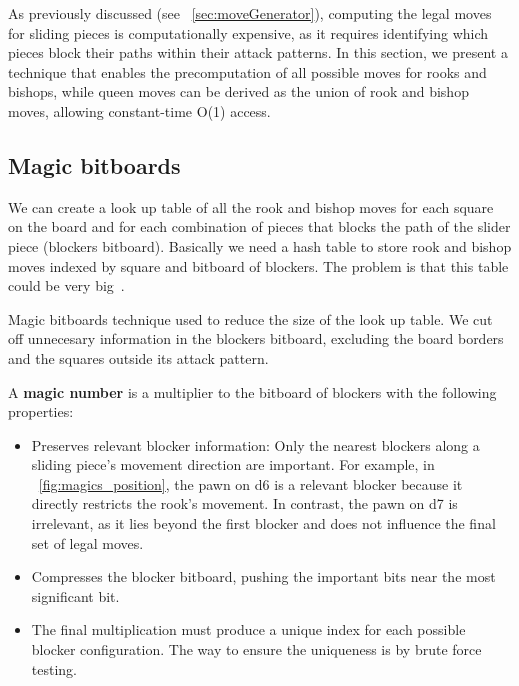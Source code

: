 As previously discussed (see ~\cref{sec:moveGenerator}), computing the legal moves for sliding pieces is computationally expensive, as it requires identifying which pieces block their paths within their attack patterns. In this section, we present a technique that enables the precomputation of all possible moves for rooks and bishops, while queen moves can be derived as the union of rook and bishop moves, allowing constant-time O(1) access.

\subsection*{Magic bitboards}

We can create a look up table of all the rook and bishop moves for each square on the board and for each combination of pieces that blocks the path of the slider piece (blockers  bitboard). Basically we need a hash table to store rook and bishop moves indexed by square and bitboard of blockers. The problem is that this table could be very big~\cite{MagicBitboards}.

\vspace{1em}

\noindent Magic bitboards technique used to reduce the size of the look up table. We cut off unnecesary information in the blockers bitboard, excluding the board borders and the squares outside its attack pattern.

\vspace{1em}

\noindent A \textbf{magic number} is a multiplier to the bitboard of blockers with the following properties:

\begin{itemize}[itemsep=1pt]
  \item Preserves relevant blocker information: 
    Only the nearest blockers along a sliding piece's movement direction are important. For example, in ~\cref{fig:magics_position}, the pawn on d6 is a relevant blocker because it directly restricts the rook's movement. In contrast, the pawn on d7 is irrelevant, as it lies beyond the first blocker and does not influence the final set of legal moves.

  \item Compresses the blocker bitboard, pushing the important bits near the most significant bit.
  \item The final multiplication must produce a unique index for each possible blocker configuration. The way to ensure the uniqueness is by brute force testing.
\end{itemize}

